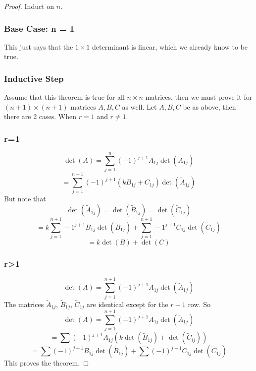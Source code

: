 \documentclass{article}
\newtheorem{one minute paper}[theorem]{One Minute Paper}
\begin{document}
\begin{proof}
    Induct on $n$. 
    \subsubsection*{Base Case: n = 1}
    This just says that the $1 \times 1$ determinant is linear, which we already know to be true. 
    \subsubsection*{Inductive Step}
    Assume that this theorem is true for all $n \times n$ matrices, then we must prove it for $(n + 1) \times (n + 1)$ matrices $A,B,C$ as well.
    Let $A,B,C$ be as above, then there are 2 cases. When $r = 1$ and $r \neq 1$. 
    \subsubsection*{r=1}
    \begin{equation}
        \det(A) = \sum_{j=1}^{n}(-1)^{j+1}A_{1j}\det(\tilde{A}_{1j})
    \end{equation}
    \begin{equation}
        = \sum_{j =1}^{n+1}(-1)^{j+1}(kB_{1j} + C_{1j})\det(\tilde{A}_{1j})
    \end{equation}
    But note that 
    \begin{equation}
        \det(\tilde{A}_{1j}) = \det(\tilde{B}_{1j}) = \det(\tilde{C}_{1j})
    \end{equation}
    \begin{equation}
        = k\sum_{j=1}^{n+1}-1^{j+1}B_{1j}\det(\tilde{B}_{1j}) + \sum_{j=1}^{n+1}-1^{j+1}C_{1j}\det(\tilde{C}_{1j})
    \end{equation}
    \begin{equation}
        = k\det(B) + \det(C)
    \end{equation}
    \subsubsection*{r>1}
    \begin{equation}
        \det(A) = \sum_{j=1}^{n+1}(-1)^{j+1}A_{1j}\det(\tilde{A}_{1j})
    \end{equation}
    The matrices $\tilde{A}_{1j}$, $\tilde{B}_{1j}$, $\tilde{C}_{1j}$ are identical except for the $r-1$ row. So 
    \begin{equation}
        \det(A) = \sum_{j=1}^{n+1}(-1)^{j+1}A_{1j}\det(\tilde{A}_{1j})
    \end{equation}
    \begin{equation}
        = \sum (-1)^{j+1}A_{1j}(k\det(\tilde{B}_{1j}) + \det(\tilde{C}_{ij}))
    \end{equation}
    \begin{equation}
        = \sum (-1)^{j+1}B_{1j}\det(\tilde{B}_{1j}) + \sum(-1)^{j+1}C_{1j}\det(\tilde{C}_{1j})
    \end{equation}
    This proves the theorem. 
\end{proof}
\end{document}
